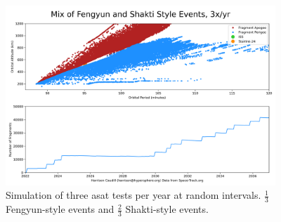 \begin{figure}[h]
  \label{figure::gabby::doomsday::doom}
  \begin{center}
    \includegraphics[width=4in]{doom.png}
  \end{center}
  \caption{Simulation of three \ac{asat} tests per year at random
    intervals.  $\frac{1}{3}$ Fengyun-style events and $\frac{2}{3}$
    Shakti-style events.}
\end{figure}
